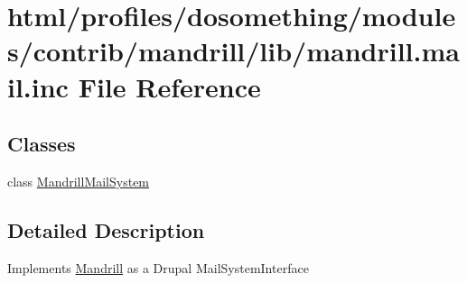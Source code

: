 \hypertarget{mandrill_8mail_8inc}{
\section{html/profiles/dosomething/modules/contrib/mandrill/lib/mandrill.mail.inc File Reference}
\label{mandrill_8mail_8inc}
}
\subsection*{Classes}
\begin{DoxyCompactItemize}
\item 
class \hyperlink{classMandrillMailSystem}{MandrillMailSystem}
\end{DoxyCompactItemize}


\subsection{Detailed Description}
Implements \hyperlink{classMandrill}{Mandrill} as a Drupal MailSystemInterface 
